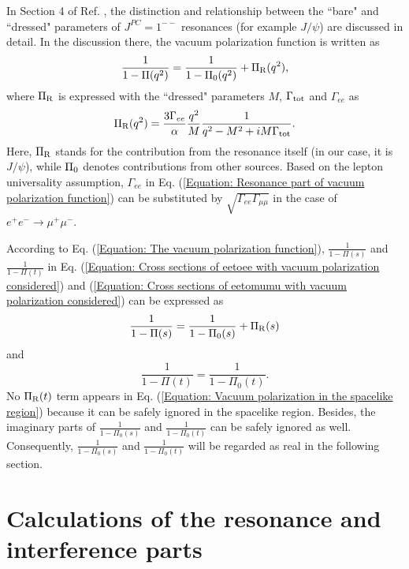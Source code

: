 \documentclass[a4paper,10pt,twoside]{cpc-hepnp}
\newcommand{\jpsiwos}{$J/\psi$}
\newcommand{\eetomumuwos}{$e^+e^- \to \mu^+\mu^-$}
\begin{document}
\begin{CJK*}{UTF8}{gbsn}
\begin{multicols}{2}
In Section 4 of Ref. \cite{KEDRpsip}, the distinction and relationship between the ``bare" and ``dressed" parameters of $J^{PC}=1^{--}$ resonances (for example \jpsiwos) are discussed in detail. In the discussion there, the vacuum polarization function is written as
\begin{equation}
	\frac{1}{1-\Pi(q^2)} = \frac{1}{1-\Pi_{\rm 0}(q^2)}+\Pi_{\rm R}(q^2),
	\label{Equation: The vacuum polarization function}
\end{equation}
where $\Pi_{\rm R}$ is expressed with the ``dressed" parameters $M$, $\Gamma_{\rm tot}$ and $\Gamma_{ee}$ as
\begin{equation}
	\Pi_{\rm R}(q^2) = \frac{3\Gamma_{ee}}{\alpha} \frac{q^2}{M} \frac{1}{q^2-M^2+iM\Gamma_{\rm tot}}.
	\label{Equation: Resonance part of vacuum polarization function}
\end{equation}
Here, $\Pi_{\rm R}$ stands for the contribution from the resonance itself (in our case, it is \jpsiwos), while $\Pi_{\rm 0}$ denotes contributions from other sources. Based on the lepton universality assumption, $\Gamma_{ee}$ in Eq. (\ref{Equation: Resonance part of vacuum polarization function}) can be substituted by $\sqrt{\Gamma_{ee}\Gamma_{\mu\mu}}$ in the case of \eetomumuwos.

According to Eq. (\ref{Equation: The vacuum polarization function}), $\frac{1}{1-\Pi(s)}$ and $\frac{1}{1-\Pi(t)}$ in Eq. (\ref{Equation: Cross sections of eetoee with vacuum polarization considered}) and (\ref{Equation: Cross sections of eetomumu with vacuum polarization considered}) can be expressed as
\begin{equation}
	\frac{1}{1-\Pi(s)} = \frac{1}{1-\Pi_0(s)} + \Pi_{\rm R}(s) \label{Equation: Vacuum polarization in the timelike region}
\end{equation}
and
\begin{equation}
	\frac{1}{1-\Pi(t)} = \frac{1}{1-\Pi_0(t)}. \label{Equation: Vacuum polarization in the spacelike region}
\end{equation}
No $\Pi_{\rm R}(t)$ term appears in Eq. (\ref{Equation: Vacuum polarization in the spacelike region}) because it can be safely ignored in the spacelike region. Besides, the imaginary parts of $\frac{1}{1-\Pi_0(s)}$ and $\frac{1}{1-\Pi_0(t)}$ can be safely ignored as well. Consequently, $\frac{1}{1-\Pi_0(s)}$ and $\frac{1}{1-\Pi_0(t)}$ will be regarded as real in the following section.


\section{Calculations of the resonance and interference parts}
\label{Calculations of the resonance and interference parts}
%

\end{multicols}
\end{CJK*}
\end{document}
